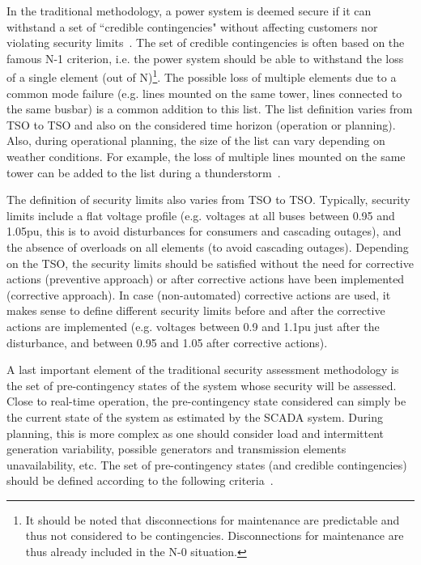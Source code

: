 In the traditional methodology, a power system is deemed secure if it can withstand a set of ``credible contingencies" without affecting customers nor violating security limits~\cite{N-1-ENTSOE}. The set of credible contingencies is often based on the famous N-1 criterion, i.e. the power system should be able to withstand the loss of a single element (out of N)\footnote{It should be noted that disconnections for maintenance are predictable and thus not considered to be contingencies. Disconnections for maintenance are thus already included in the N-0 situation.}.
The possible loss of multiple elements due to a common mode failure (e.g. lines mounted on the same tower, lines connected to the same busbar) is a common addition to this list. The list definition varies from TSO to TSO and also on the considered time horizon (operation or planning). Also, during operational planning, the size of the list can vary depending on weather conditions. For example, the loss of multiple lines mounted on the same tower can be added to the list during a thunderstorm~\cite{N-1-ENTSOE}.

The definition of security limits also varies from TSO to TSO. Typically, security limits include a flat voltage profile (e.g. voltages at all buses between 0.95 and 1.05pu, this is to avoid disturbances for consumers and cascading outages), and the absence of overloads on all elements (to avoid cascading outages). Depending on the TSO, the security limits should be satisfied without the need for corrective actions (preventive approach) or after corrective actions have been implemented (corrective approach). In case (non-automated) corrective actions are used, it makes sense to define different security limits before and after the corrective actions are implemented (e.g. voltages between 0.9 and 1.1pu just after the disturbance, and between 0.95 and 1.05 after corrective actions).

A last important element of the traditional security assessment methodology is the set of pre-contingency states of the system whose security will be assessed. Close to real-time operation, the pre-contingency state considered can simply be the current state of the system as estimated by the SCADA system. During planning, this is more complex as one should consider load and intermittent generation variability, possible generators and transmission elements unavailability, etc. The set of pre-contingency states (and credible contingencies) should be defined according to the following criteria~\cite{CIGREreviewOfTools}.

